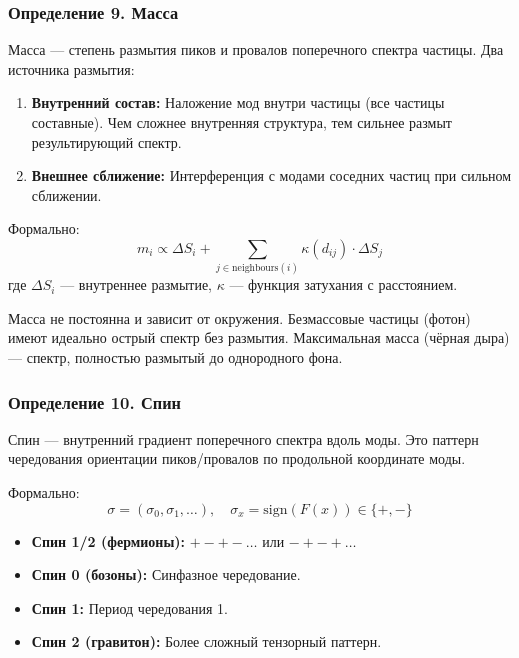 \documentclass[12pt,a4paper]{article}
\begin{document}
\subsubsection{Определение 9. Масса}
Масса --- степень размытия пиков и провалов поперечного спектра частицы. Два источника размытия:
\begin{enumerate}[label=\arabic*.]
    \item \textbf{Внутренний состав:} Наложение мод внутри частицы (все частицы составные). Чем сложнее внутренняя структура, тем сильнее размыт результирующий спектр.
    \item \textbf{Внешнее сближение:} Интерференция с модами соседних частиц при сильном сближении.
\end{enumerate}

Формально:
\begin{equation}
    m_i \propto \Delta S_i + \sum_{j \in \text{neighbours}(i)} \kappa(d_{ij}) \cdot \Delta S_j
\end{equation}
где $\Delta S_i$ --- внутреннее размытие, $\kappa$ --- функция затухания с расстоянием.

Масса не постоянна и зависит от окружения. Безмассовые частицы (фотон) имеют идеально острый спектр без размытия. Максимальная масса (чёрная дыра) --- спектр, полностью размытый до однородного фона.

\subsubsection{Определение 10. Спин}
Спин --- внутренний градиент поперечного спектра вдоль моды. Это паттерн чередования ориентации пиков/провалов по продольной координате моды.

Формально:
\begin{equation}
    \sigma = (\sigma_0, \sigma_1, \dots), \quad \sigma_x = \text{sign}(F(x)) \in \{+, -\}
\end{equation}

\begin{itemize}
    \item \textbf{Спин 1/2 (фермионы):} $+ - + - \dots$ или $- + - + \dots$
    \item \textbf{Спин 0 (бозоны):} Синфазное чередование.
    \item \textbf{Спин 1:} Период чередования 1.
    \item \textbf{Спин 2 (гравитон):} Более сложный тензорный паттерн.
\end{itemize}
\end{document}
